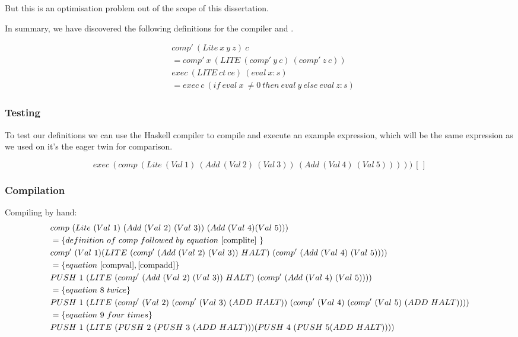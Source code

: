 \documentclass {article}
\begin{document}
But this is an optimisation problem out of the scope of this dissertation.

In summary, we have discovered the following 
definitions for the compiler and \vm.

\begin{eqnarray}
&comp'\ (Lite\ x\ y\ z)\ c \nonumber \\
	&= comp'\ x\ (LITE\ (comp'\ y\ c)\ (comp'\ z\ c)) \label{complite} \\
&exec\ (LITE\ ct\ ce)\ (eval\ x:s) \nonumber \\
	&= exec\ c\ (if\ eval\ x\ \not= 0\ then\ eval\ y\ else\ eval\ z : s) \label{execlite}
\end{eqnarray}

\subsubsection{Testing}

To test our definitions we can use the Haskell compiler
to compile and execute an example \lite expression,
which will be the same expression as we used
on it's the eager twin for comparison.

\[ exec\ (comp\ (Lite\ (Val\ 1)\
		 (Add\ (Val\ 2)\ (Val\ 3))\ 
		(Add\ (Val\ 4)\ (Val\ 5)))))\ [\, ] \]

\subsubsection{Compilation}

Compiling by hand:
\begin{align*}	
&comp\ (Lite\ (Val\ 1)\ (Add\ (Val\ 2)\ (Val\ 3))\ (Add\ (Val\ 4) (Val\ 5))) \\
&= \{ definition\ of\ comp\ followed\ by\ equation\ \ref{complite}\ \} \\
&comp'\ (Val\ 1) (LITE\ (comp'\ (Add\ (Val\ 2)\ (Val\ 3))\ HALT)\ (comp'\  (Add\ (Val\ 4)\ (Val\ 5)))) \\
&= \{ equation\ \ref{compval}, \ref{compadd} \} \\
&PUSH\ 1\ (LITE\ (comp'\ (Add\ (Val\ 2)\ (Val\ 3))\ HALT)\ (comp'\ (Add\ (Val\ 4)\ (Val\ 5)))) \\
&= \{ equation\ 8\ twice \} \\
&PUSH\ 1\ (LITE\ (comp'\ (Val\ 2)\ (comp'\ (Val\ 3)\ (ADD\ HALT))\ (comp'\  (Val\ 4)\ (comp'\ (Val\ 5)\ (ADD\ HALT)))) \\
&= \{ equation\ 9\ four\ times \} \\
&PUSH\ 1\ (LITE\ (PUSH\ 2\ (PUSH\ 3\ (ADD\ HALT))) (PUSH\ 4\ (PUSH\ 5 (ADD\ HALT))))
\end{align*}
\end{document}
